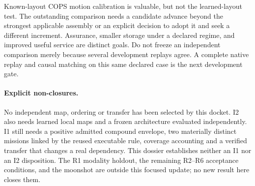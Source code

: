 \documentclass{article}
\begin{document}
Known-layout COPS motion calibration is valuable, but not the
learned-layout test. The outstanding comparison needs a candidate
advance beyond the strongest applicable assembly or an explicit
decision to adopt it and seek a different increment. Assurance,
smaller storage under a declared regime, and improved useful service
are distinct goals. Do not freeze an independent comparison merely
because several development replays agree. A complete native replay
and causal matching on this same declared case is the next
development gate.

\paragraph{Explicit non-closures.}
No independent map, ordering or transfer has been selected by this
docket. I2 also needs learned local maps and a frozen architecture
evaluated independently. I1 still needs a positive admitted
compound envelope, two materially distinct missions linked by the
reused executable rule, coverage accounting and a verified transfer
that changes a real dependency. This dossier establishes neither
an I1 nor an I2 disposition. The R1 modality holdout, the remaining
R2--R6 acceptance conditions, and the moonshot are outside this
focused update; no new result here closes them.
\end{document}
